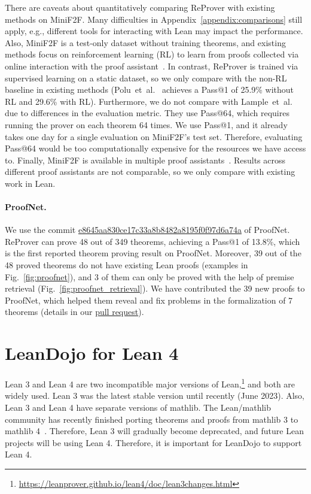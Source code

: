 \documentclass{article}
\newcommand{\smallsec}[1]{\vspace{-1mm} \paragraph{#1.}}
\newcommand\name{ReProver}
\begin{document}
There are caveats about quantitatively comparing {\name} with existing methods on MiniF2F. Many difficulties in Appendix~\ref{appendix:comparisons} still apply, e.g., different tools for interacting with Lean may impact the performance. Also, MiniF2F is a test-only dataset without training theorems, and existing methods focus on reinforcement learning (RL) to learn from proofs collected via online interaction with the proof assistant~\cite{polu2023formal,lample2022hypertree}. In contrast, {\name} is trained via supervised learning on a static dataset, so we only compare with the non-RL baseline in existing methods (Polu~et~al.~\cite{polu2023formal} achieves a Pass@1 of 25.9\% without RL and 29.6\% with RL). Furthermore, we do not compare with Lample~et~al.~\cite{lample2022hypertree} due to differences in the evaluation metric. They use Pass@64, which requires running the prover on each theorem 64 times. We use Pass@1, and it already takes one day for a single evaluation on MiniF2F's test set. Therefore, evaluating Pass@64 would be too computationally expensive for the resources we have access to. Finally, MiniF2F is available in multiple proof assistants~\cite{jiang2022thor,jiang2023draft,zhao2023decomposing}. Results across different proof assistants are not comparable, so we only compare with existing work in Lean.


\smallsec{ProofNet}
We use the commit \href{https://github.com/zhangir-azerbayev/ProofNet/commit/e8645aa830ce17c33a8b8482a8195f0f97d6a74a}{e8645aa830ce17c33a8b8482a8195f0f97d6a74a} of ProofNet. {\name} can prove 48 out of 349 theorems, achieving a Pass@1 of 13.8\%, which is the first reported theorem proving result on ProofNet. Moreover, 39 out of the 48 proved theorems do not have existing Lean proofs (examples in Fig.~\ref{fig:proofnet}), and 3 of them can only be proved with the help of premise retrieval (Fig.~\ref{fig:proofnet_retrieval}).
We have contributed the 39 new proofs to ProofNet, which helped them reveal and fix problems in the formalization of 7 theorems (details in our \href{https://github.com/zhangir-azerbayev/ProofNet/pull/14}{pull request}).



\section{LeanDojo for Lean 4}
\label{appendix:lean4}

Lean 3 and Lean 4 are two incompatible major versions of Lean,\footnote{\url{https://leanprover.github.io/lean4/doc/lean3changes.html}} and both are widely used. Lean 3 was the latest stable version until recently (June 2023). Also, Lean 3 and Lean 4 have separate versions of mathlib. The Lean/mathlib community has recently finished porting theorems and proofs from mathlib 3 to mathlib 4~\cite{mathport}. Therefore, Lean 3 will gradually become deprecated, and future Lean projects will be using Lean 4. Therefore, it is important for LeanDojo to support Lean 4.
\end{document}
